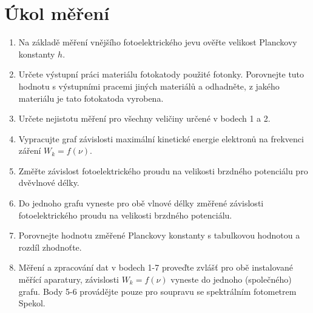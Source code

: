 \documentclass[titlepage]{article}
\begin{document}
\begin{titlepage}
 
\end{titlepage}

\tableofcontents
\newpage

\section{Úkol měření}

\begin{enumerate}
 \item Na základě měření vnějšího fotoelektrického jevu ověřte velikost Planckovy konstanty $h$.
 \item Určete výstupní práci materiálu fotokatody použité fotonky. Porovnejte tuto hodnotu s výstupními pracemi jiných materiálů a odhadněte, z jakého materiálu je tato fotokatoda vyrobena.
 \item Určete nejistotu měření pro všechny veličiny určené v bodech 1 a 2.
 \item Vypracujte graf závislosti maximální kinetické energie elektronů na frekvenci záření $W_k = f(\nu)$.
 \item Změřte závislost fotoelektrického proudu na velikosti brzdného potenciálu pro dvěvlnové délky.
 \item Do jednoho grafu vyneste pro obě vlnové délky změřené závislosti fotoelektrického proudu na velikosti brzdného potenciálu.
 \item Porovnejte hodnotu změřené Planckovy konstanty s tabulkovou hodnotou a rozdíl zhodnoťte.
 \item Měření a zpracování dat v bodech 1-7 proveďte zvlášť pro obě instalované měřící aparatury, závislosti $W_k= f(\nu)$ vyneste do jednoho (společného) grafu. Body 5-6 provádějte pouze pro soupravu se spektrálním fotometrem Spekol.
\end{enumerate}
\end{document}
